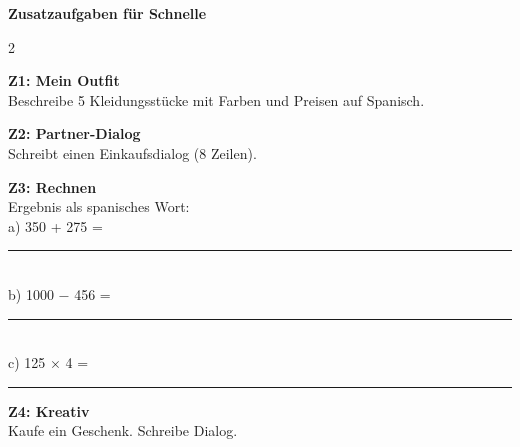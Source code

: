 \documentclass[11pt, a4paper]{article}
\begin{document}
\vspace{8pt}


\begin{tcolorbox}[
    colback=white, colframe=rahmen, boxrule=0.5pt, arc=0pt,
    left=8pt, right=8pt, top=6pt, bottom=6pt,
    borderline north={1.5pt}{0pt}{akzent}
]
{\small\textbf{Zusatzaufgaben für Schnelle}}

\vspace{4pt}

\begin{multicols}{2}
\footnotesize

\textbf{Z1: Mein Outfit}\\
Beschreibe 5 Kleidungsstücke mit Farben und Preisen auf Spanisch.

\vspace{4pt}

\textbf{Z2: Partner-Dialog}\\
Schreibt einen Einkaufsdialog (8 Zeilen).

\columnbreak

\textbf{Z3: Rechnen}\\
Ergebnis als spanisches Wort:\\
a) 350 + 275 = \rule{2cm}{0.3pt}\\
b) 1000 $-$ 456 = \rule{2cm}{0.3pt}\\
c) 125 $\times$ 4 = \rule{2cm}{0.3pt}

\vspace{4pt}

\textbf{Z4: Kreativ}\\
Kaufe ein Geschenk. Schreibe Dialog.

\end{multicols}
\end{tcolorbox}

\vspace{8pt}

\end{document}
